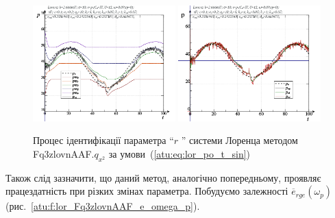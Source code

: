 \begin{figure}[ht!]
  \centerline{
    \includegraphics[width=0.49\textwidth]{p/cha/lor/Fq3zlovnAAF/lor_Fq3zlovnAAF_qx2-pl_n_sin.png}
    \hfill
    \includegraphics[width=0.49\textwidth]{p/cha/lor/Fq3zlovnAAF/lor_Fq3zlovnAAF_qx2-p_p_sin.png}
  }
\caption{Процес ідентифікації параметра ``$ r $ '' системи Лоренца методом Fq3zlovnAAF.$q_{x^2} $ за умови~(\ref{atu:eq:lor_po_t_sin})}
\label{atu:f:lor_id_Fq3zlovnAAF.q_x2_sin}
\end{figure}

Також слід зазначити, що даний метод, аналогічно попередньому,
проявляє працездатність при різких змінах параметра. Побудуємо
залежності
$\overline{e}_{rge}(\omega_p)$ (рис.~\ref{atu:f:lor_Fq3zlovnAAF_e_omega_p}).


